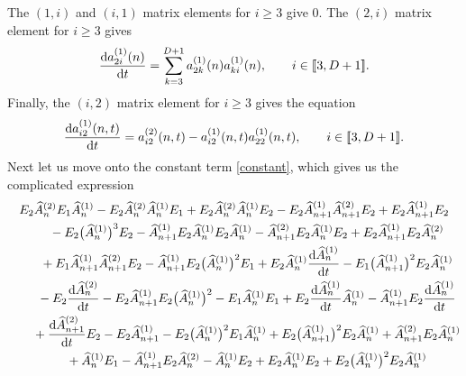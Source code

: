 \documentclass[pdftex]{sigma}
\numberwithin{equation}{section}
\begin{document}
The $(1,i)$ and $(i,1)$ matrix elements for $i\geq 3$ give $0$. The $(2,i)$ matrix element for $i \geq 3$ gives
\begin{align*}
\frac{{\rm d} a_{2i}^{(1)}(n)}{{\rm d}t} = \sum_{k=3}^{D+1} a_{2k}^{(1)}(n) a_{ki}^{(1)}(n), \qquad i \in [\![ 3, D+1]\!].
\end{align*}
Finally, the $(i,2)$ matrix element for $i\geq 3$ gives the equation
\begin{align*}
\frac{{\rm d} a_{i2}^{(1)}(n,t)}{{\rm d}t} = a_{i2}^{(2)}(n,t) - a_{i2}^{(1)}(n,t) a_{22}^{(1)}(n,t), \qquad i \in [\![ 3, D+1]\!].
\end{align*}
Next let us move onto the constant term \eqref{constant}, which gives us the complicated expression
\begin{gather}
 E_2 \widehat{A}^{(2)}_n E_1 \widehat{A}^{(1)}_n - E_2 \widehat{A}^{(2)}_n \widehat{A}^{(1)}_n E_1 + E_2 \widehat{A}^{(2)}_n \widehat{A}^{(1)}_n E_2 - E_2 \widehat{A}^{(1)}_{n+1} \widehat{A}^{(2)}_{n+1} E_2
 + E_2 \widehat{A}^{(1)}_{n+1} E_2\nonumber
 \\
\qquad{}- E_2 \big(\widehat{A}^{(1)}_n\big)^3 E_2
- \widehat{A}^{(1)}_{n+1} E_2 \widehat{A}^{(1)}_n E_2 \widehat{A}^{(1)}_n - \widehat{A}^{(2)}_{n+1} E_2 \widehat{A}^{(1)}_n E_2
 + E_2 \widehat{A}^{(1)}_{n+1} E_2 \widehat{A}^{(2)}_n\nonumber\\
 \qquad{}+ E_1 \widehat{A}^{(1)}_{n+1} \widehat{A}^{(2)}_{n+1} E_2
 - \widehat{A}^{(1)}_{n+1} E_2 \big(\widehat{A}^{(1)}_n\big)^2 E_1 + E_2 \widehat{A}^{(1)}_n \frac{{\rm d} \widehat{A}^{(1)}_n }{{\rm d}t}
- E_1 \big(\widehat{A}^{(1)}_{n+1}\big)^2 E_2 \widehat{A}^{(1)}_n\nonumber \\
 \qquad{}- E_2 \frac{ {\rm d} \widehat{A}^{(2)}_n}{{\rm d}t}
- E_2 \widehat{A}^{(1)}_{n+1} E_2 \big(\widehat{A}^{(1)}_n \big)^2 - E_1 \widehat{A}^{(1)}_n E_1 + E_2 \frac{ {\rm d} \widehat{A}^{(1)}_n}{{\rm d}t} \widehat{A}^{(1)}_n
 - \widehat{A}^{(1)}_{n+1} E_2 \frac{ {\rm d} \widehat{A}^{(1)}_n}{{\rm d}t}\nonumber\\
\qquad{}+ \frac{ {\rm d} \widehat{A}^{(2)}_{n+1}}{{\rm d}t} E_2 - E_2 \widehat{A}^{(1)}_{n+1}
- E_2 \big(\widehat{A}^{(1)}_n \big)^2 E_1 \widehat{A}^{(1)}_n
 + E_2 \big(\widehat{A}^{(1)}_{n+1}\big)^2 E_2 \widehat{A}^{(1)}_n + \widehat{A}^{(2)}_{n+1} E_2 \widehat{A}^{(1)}_n \nonumber\\
\qquad{}+ \widehat{A}^{(1)}_n E_1 - \widehat{A}^{(1)}_{n+1} E_2 \widehat{A}^{(2)}_n
 - \widehat{A}^{(1)}_n E_2 + E_2 \widehat{A}^{(1)}_n E_2
+ E_2 \big(\widehat{A}^{(1)}_n\big)^2 E_2 \widehat{A}^{(1)}_n \nonumber \\

\end{gather}
\end{document}
